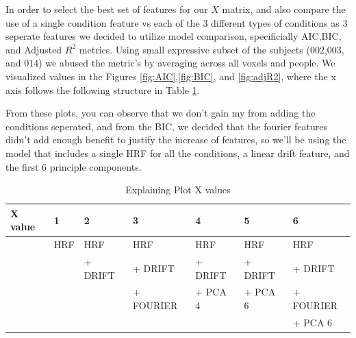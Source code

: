 
\par In order to select the best set of features for our $X$ matrix, and also 
compare the use of a single condition feature vs each of the 3 different types
of conditions as 3 seperate features we decided to utilize model comparison, 
specificially AIC,BIC, and Adjusted $R^2$ metrics. Using small expressive
subset of the subjects ($002$,$003$, and $014$) we abused the metric's by
averaging across all voxels and people.  We visualized values in the Figures
\ref{fig:AIC},\ref{fig:BIC}, and \ref{fig:adjR2}, where the x axis follows the 
following structure in Table \ref{tab:plot}.

\par From these plots, you can observe that we don't gain my from adding
the conditions seperated, and from the BIC, we decided that the fourier
features didn't add enough benefit to justify the increase of features, so we'll
be using the model that includes a single HRF for all the conditions, a linear
drift feature, and the first 6 principle components.

\begin{table}
\centering
	\begin{tabular}{l ||  l   |  l  |   l    | l  | l  |  l}
X value & 1 &        2       &             3       &     4         &        5        &         6       \\
	 \hline
	 & HRF &   HRF       &  HRF            & HRF         &  HRF        & HRF  \\
	 &        &   + DRIFT &  + DRIFT      & + DRIFT  &  + DRIFT   & + DRIFT  \\
	 &        &                 &  + FOURIER &  + PCA 4 &  + PCA 6   & + FOURIER \\
	 &        &                 &                      &                &                   & +  PCA 6 \\
	

	\end{tabular}
\caption{Explaining Plot X values}
\label{tab:plot}
\end{table}


